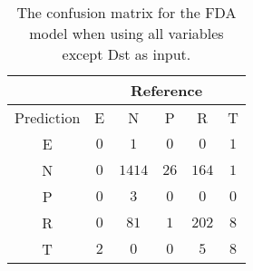 \begin{table}[!ht]
	\centering
	\begin{tabular}{|c|c|c|c|c|c|}
		\hline
		 & \multicolumn{5}{|c|}{Reference} \\ \hline
		 Prediction & E & N & P & R & T \\ \hline
		 E & $0$ & $1$ & $0$ & $0$ & $1$ \\ \hline
		 N & $0$ & $1414$ & $26$ & $164$ & $1$ \\ \hline
		 P & $0$ & $3$ & $0$ & $0$ & $0$ \\ \hline
		 R & $0$ & $81$ & $1$ & $202$ & $8$ \\ \hline
		 T & $2$ & $0$ & $0$ & $5$ & $8$ \\ \hline
	\end{tabular}
	\caption{The confusion matrix for the FDA model when using all variables except Dst as input.}
	\label{tab:cm:noDst:fda}
\end{table}
